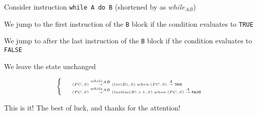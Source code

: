 \documentclass{beamer}
\begin{document}
\begin{slide}{
\item Consider instruction \texttt{while A do B} (shortened by as $while_{AB}$)
\pause
\item We jump to the first instruction of the \texttt{B} block if the condition evaluates to \texttt{TRUE}
\pause
\item We jump to after the last instruction of the \texttt{B} block if the condition evaluates to \texttt{FALSE}
\pause
\item We leave the state unchanged
\pause

$$
\tiny
\left\lbrace
\begin{array}{l l}
&(PC,S) \overset{while_{AB}}{\rightarrow} (loc(B),S) \; when \; (PC,S) \overset{A}{\rightarrow} \mathtt{TRUE} \\
&(PC,S) \overset{while_{AB}}{\rightarrow} (lastloc(B)+1,S) \; when \; (PC,S) \overset{A}{\rightarrow} \mathtt{FALSE} \\
\end{array}
\right.
$$

}\end{slide}

\begin{frame}{This is it!}
\center
\fontsize{18pt}{7.2}\selectfont
The best of luck, and thanks for the attention!
\end{frame}
\end{document}
